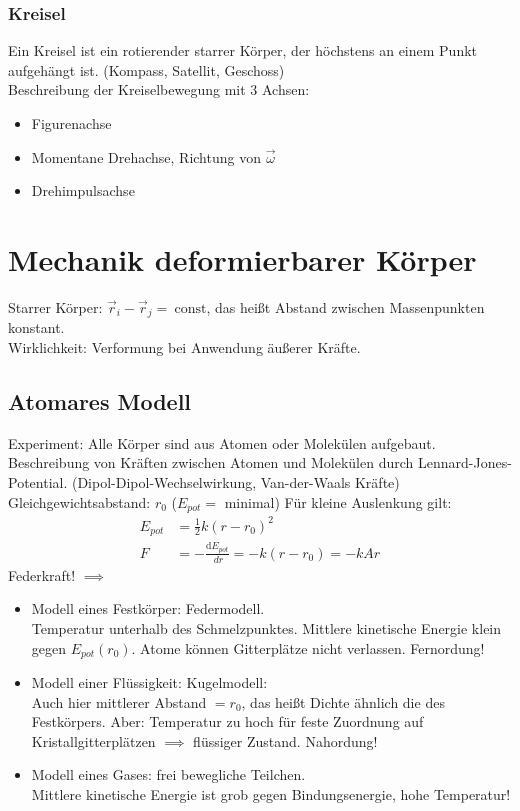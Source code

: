 \documentclass[a4paper]{scrartcl}
\renewcommand{\d}{\mathrm{d}}
\renewcommand{\v}[1]{\vec{#1}}
\newcommand{\dd}[2]{\frac{\d #1}{\ d#2}}
\theoremstyle{definition}
\theoremstyle{plain}
\theoremstyle{plain}
\theoremstyle{remark}
\theoremstyle{remark}
\theoremstyle{remark}
\begin{document}
\subsubsection{Kreisel}
\label{sec-8-8-1}
Ein Kreisel ist ein rotierender starrer Körper, der höchstens an einem Punkt aufgehängt ist. (Kompass, Satellit, Geschoss) \\
        Beschreibung der Kreiselbewegung mit 3 Achsen:
\begin{itemize}
\item Figurenachse
\item Momentane Drehachse, Richtung von $\v \omega$
\item Drehimpulsachse
\end{itemize}
\section{Mechanik deformierbarer Körper}
\label{sec-9}
Starrer Körper: $\v r_i - \v r_j = ~\text{const}$, das heißt Abstand zwischen Massenpunkten konstant. \\
  Wirklichkeit: Verformung bei Anwendung äußerer Kräfte.
\subsection{Atomares Modell}
\label{sec-9-1}
Experiment: Alle Körper sind aus Atomen oder Molekülen aufgebaut.
Beschreibung von Kräften zwischen Atomen und Molekülen durch Lennard-Jones-Potential. (Dipol-Dipol-Wechselwirkung, Van-der-Waals Kräfte) \\
   Gleichgewichtsabstand: $r_0$ ($E_{pot} =$ minimal)
Für kleine Auslenkung gilt:
\begin{align*}
E_{pot} &= \frac{1}{2}k(r - r_0)^2 \\
F &= -\dd{E_{pot}}{r} = -k(r - r_0) = -k Ar
\end{align*}
Federkraft!
$\implies$
\begin{itemize}
\item Modell eines Festkörper: Federmodell. \\
         Temperatur unterhalb des Schmelzpunktes. Mittlere kinetische Energie klein gegen $E_{pot}(r_0)$.
Atome können Gitterplätze nicht verlassen. Fernordung!
\item Modell einer Flüssigkeit: Kugelmodell: \\
         Auch hier mittlerer Abstand $= r_0$, das heißt Dichte ähnlich die des Festkörpers.
Aber: Temperatur zu hoch für feste Zuordnung auf Kristallgitterplätzen $\implies$ flüssiger Zustand. Nahordung!
\item Modell eines Gases: frei bewegliche Teilchen. \\
         Mittlere kinetische Energie ist grob gegen Bindungsenergie, hohe Temperatur!
\end{itemize}
\end{document}
